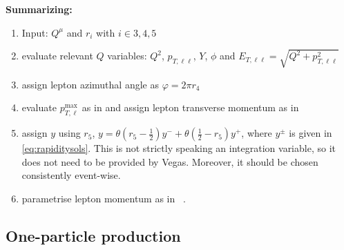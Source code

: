 \documentclass[a4paper,11pt]{article}
\begin{document}
\noindent
\textbf{Summarizing:}
\begin{enumerate}
\item Input: $Q^\mu$ and $r_i$ with $i \in {3,4,5}$
\item evaluate relevant $Q$ variables: $Q^2$, $p_{T,\ell\ell}$, $Y$, $\phi$ and
$E_{T,\ell\ell} = \sqrt{Q^2 + p_{T,\ell\ell}^2}$
\item assign lepton azimuthal angle as $\varphi = 2\pi r_4$
\item evaluate $p^{\max}_{T,\ell}$ as in  and assign
lepton transverse momentum as in 
\item assign $y$ using $r_5$, \eg 
$y = \theta(r_5 - \frac{1}{2}) y^- + \theta(\frac{1}{2}-r_5) y^+$, where $y^\pm$ is given in \eqref{eq:rapiditysols}.
This is not strictly speaking an integration variable, so it does not need to be 
provided by Vegas. Moreover, it should be chosen consistently event-wise.
\item parametrise lepton momentum as in \, .
\end{enumerate}

\subsection{One-particle production}
\label{se:oneparticleproduction}
\end{document}
